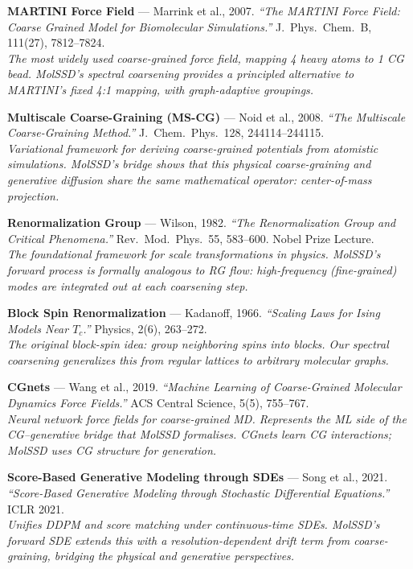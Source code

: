 \documentclass[12pt,a4paper]{article}
\begin{document}
\begin{enumerate}[leftmargin=*, label={[\arabic*]}]

\item \textbf{MARTINI Force Field} --- Marrink et al., 2007.
\textit{``The MARTINI Force Field: Coarse Grained Model for Biomolecular Simulations.''}
J.\ Phys.\ Chem.\ B, 111(27), 7812--7824.\\
\emph{The most widely used coarse-grained force field, mapping 4 heavy atoms to 1 CG bead. MolSSD's spectral coarsening provides a principled alternative to MARTINI's fixed 4:1 mapping, with graph-adaptive groupings.}

\item \textbf{Multiscale Coarse-Graining (MS-CG)} --- Noid et al., 2008.
\textit{``The Multiscale Coarse-Graining Method.''}
J.\ Chem.\ Phys.\ 128, 244114--244115.\\
\emph{Variational framework for deriving coarse-grained potentials from atomistic simulations. MolSSD's bridge shows that this physical coarse-graining and generative diffusion share the same mathematical operator: center-of-mass projection.}

\item \textbf{Renormalization Group} --- Wilson, 1982.
\textit{``The Renormalization Group and Critical Phenomena.''}
Rev.\ Mod.\ Phys.\ 55, 583--600. Nobel Prize Lecture.\\
\emph{The foundational framework for scale transformations in physics. MolSSD's forward process is formally analogous to RG flow: high-frequency (fine-grained) modes are integrated out at each coarsening step.}

\item \textbf{Block Spin Renormalization} --- Kadanoff, 1966.
\textit{``Scaling Laws for Ising Models Near $T_c$.''}
Physics, 2(6), 263--272.\\
\emph{The original block-spin idea: group neighboring spins into blocks. Our spectral coarsening generalizes this from regular lattices to arbitrary molecular graphs.}

\item \textbf{CGnets} --- Wang et al., 2019.
\textit{``Machine Learning of Coarse-Grained Molecular Dynamics Force Fields.''}
ACS Central Science, 5(5), 755--767.\\
\emph{Neural network force fields for coarse-grained MD. Represents the ML side of the CG--generative bridge that MolSSD formalises. CGnets learn CG interactions; MolSSD uses CG structure for generation.}

\item \textbf{Score-Based Generative Modeling through SDEs} --- Song et al., 2021.
\textit{``Score-Based Generative Modeling through Stochastic Differential Equations.''}
ICLR 2021.\\
\emph{Unifies DDPM and score matching under continuous-time SDEs. MolSSD's forward SDE extends this with a resolution-dependent drift term from coarse-graining, bridging the physical and generative perspectives.}

\end{enumerate}
\end{document}
